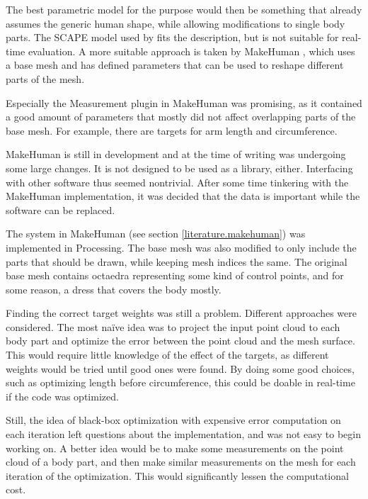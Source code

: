 The best parametric model for the purpose would then be something that already assumes the generic human shape, while allowing  modifications to single body parts. The SCAPE model \citep{anguelov2005scape} used by \citet{weiss2011home} fits the description, but is not suitable for real-time evaluation. A more suitable approach is taken by MakeHuman \citep{makehuman}, which uses a base mesh and has defined parameters that can be used to reshape different parts of the mesh.

Especially the Measurement plugin in MakeHuman was promising, as it contained a good amount of parameters that mostly did not affect overlapping parts of the base mesh. For example, there are targets for arm length and circumference.

MakeHuman is still in development and at the time of writing was undergoing some large changes. It is not designed to be used as a library, either. Interfacing with other software thus seemed nontrivial. After some time tinkering with the MakeHuman implementation, it was decided that the data is important while the software can be replaced.

The  system in MakeHuman (see section \ref{literature.makehuman}) was implemented in Processing. The base mesh was also modified to only include the parts that should be drawn, while keeping mesh indices the same. The original base mesh contains octaedra representing some kind of control points, and for some reason, a dress that covers the body mostly.

\newtopic

Finding the correct target weights was still a problem. Different approaches were considered. The most naïve idea was to project the input point cloud to each body part and optimize the error between the point cloud and the mesh surface. This would require little knowledge of the effect of the targets, as different weights would be tried until good ones were found. By doing some good choices, such as optimizing length before circumference, this could be doable in real-time if the code was optimized.

Still, the idea of black-box optimization with expensive error computation on each iteration left questions about the implementation, and was not easy to begin working on. A better idea would be to make some measurements on the point cloud of a body part, and then make similar measurements on the mesh for each iteration of the optimization. This would significantly lessen the computational cost.

